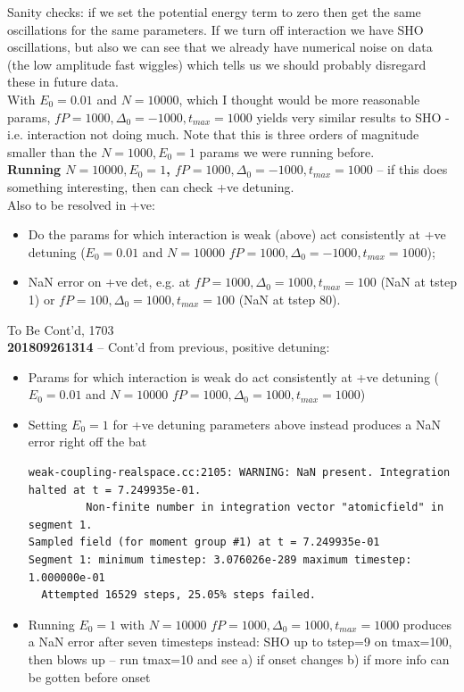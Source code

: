 \documentclass[a4paper,nobalancelastpage]{revtex4-1}
\newcommand{\mmtitle}[1]{\textcolor{multimode}{\textbf{#1}}}
\begin{document}
Sanity checks: if we set the potential energy term to zero then get the same oscillations for the same parameters. If we turn off interaction we have SHO oscillations, but also we can see that we already have numerical noise on data (the low amplitude fast wiggles) which tells us we should probably disregard these in future data.\\

With $E_0=0.01$ and $N=10000$, which I thought would be more reasonable params, $fP=1000, \Delta_0=-1000, t_{max}=1000$ yields very similar results to SHO - i.e. interaction not doing much.  Note that this is three orders of magnitude smaller than the $N=1000, E_0=1$ params we were running before.\\

\textbf{Running $N=10000, E_0=1$, $fP=1000, \Delta_0=-1000, t_{max}=1000$} -- if this does something interesting, then can check +ve detuning. \\

Also to be resolved in +ve: 
\begin{itemize}
\item Do the params for which interaction is weak (above) act consistently at +ve detuning ($E_0=0.01$ and $N=10000$ $fP=1000, \Delta_0=-1000, t_{max}=1000$);
\item NaN error on +ve det, e.g. at $fP=1000, \Delta_0=1000, t_{max}=100$ (NaN at tstep 1) or  $fP=100, \Delta_0=1000, t_{max}=100$ (NaN at tstep 80).
\end{itemize}
 To Be Cont'd, 1703\\

\mmtitle{201809261314} -- Cont'd from previous, positive detuning:
\begin{itemize}
\item Params for which interaction is weak do act consistently at +ve detuning ($E_0=0.01$ and $N=10000$ $fP=1000, \Delta_0=1000, t_{max}=1000$)

\item Setting $E_0=1$ for +ve detuning parameters above instead produces a NaN error right off the bat

\begin{verbatim}
weak-coupling-realspace.cc:2105: WARNING: NaN present. Integration halted at t = 7.249935e-01.
         Non-finite number in integration vector "atomicfield" in segment 1.
Sampled field (for moment group #1) at t = 7.249935e-01
Segment 1: minimum timestep: 3.076026e-289 maximum timestep: 1.000000e-01
  Attempted 16529 steps, 25.05% steps failed.
\end{verbatim}

\item Running $E_0=1$ with $N=10000$ $fP=1000, \Delta_0=1000, t_{max}=1000$ produces a NaN error after seven timesteps instead: SHO up to tstep=9 on tmax=100, then blows up -- run tmax=10 and see a) if onset changes b) if more info can be gotten before onset

\end{itemize}
\end{document}
